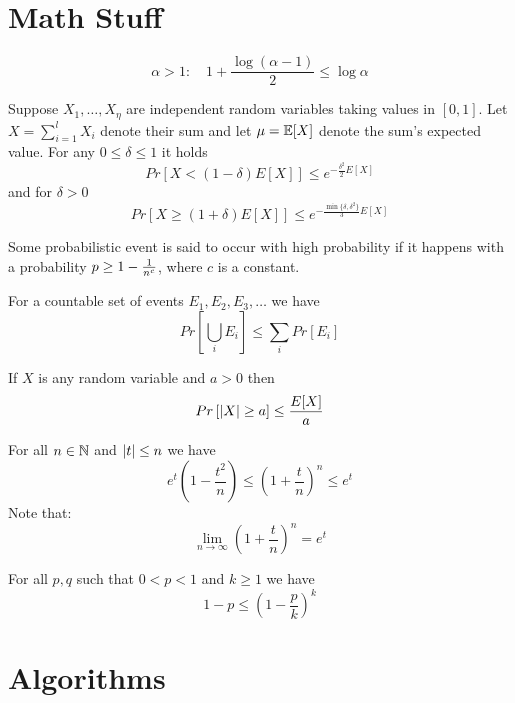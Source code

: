 \documentclass[11pt, oneside]{book}   						%
\begin{document}
\chapter{Math Stuff}
\begin{mythm}$$\alpha > 1: \quad 1+\frac{\log(\alpha-1)}{2} \le \log \alpha$$\end{mythm}
\begin{mythm} Suppose $X_1, \hdots, X_\eta$ are independent random variables taking values in $[0,1]$. Let $X=\sum_{i=1}^lX_i$ denote their sum and let $\mu=\mathbb{E}[X]$ denote the sum's expected value. For any $0\le \delta \le 1$ it holds
	$$Pr[X < (1-\delta)E[X]] \le e^{-\frac{\delta^2}{2}E[X]}$$
and for $\delta > 0$
	$$Pr[X\ge (1+\delta) E[X]] \le e^{-\frac{\min\{\delta, \delta^2\}}{3}E[X]}$$
\end{mythm}
\begin{mydef} Some probabilistic event is said to occur with high probability if it happens with a probability $p\ge 1-\frac{1}{n^c}$, where $c$ is a constant.\end{mydef}
\begin{mythm} For a countable set of events $E_1, E_2, E_3, \hdots$ we have
	$$Pr\left[\bigcup_iE_i\right] \le \sum_i Pr[E_i]$$
\end{mythm}
\begin{mythm} If $X$ is any random variable and $a>0$ then
	$$Pr\left[\left\vert X \right\vert\ge a\right] \le \frac{E[X]}{a}$$
\end{mythm}
\begin{mythm}For all $n\in \mathbb{N}$ and $\left\vert t \right\vert \le n$ we have 
	$$e^t\left(1-\frac{t^2}{n}\right)\le \left(1+\frac{t}{n}\right)^n\le e^t$$
Note that:
	$$\lim_{n\to \infty}\left(1+\frac{t}{n}\right)^n = e^t$$
\end{mythm}
\begin{mythm}For all $p,q$ such that $0<p<1$ and $k\ge 1$ we have
	$$1-p\le \left(1-\frac{p}{k}\right)^k$$
\end{mythm}

\chapter{Algorithms}
\end{document}
